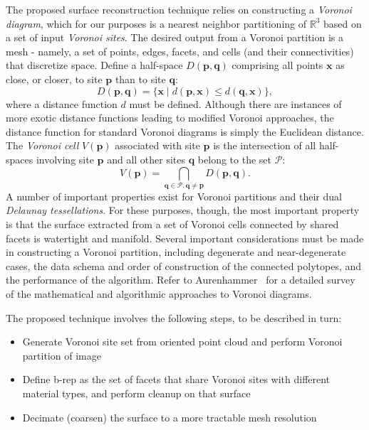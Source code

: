 The proposed surface reconstruction technique relies on constructing a \textit{Voronoi diagram}, which for our purposes is a nearest neighbor partitioning of $\mathbb{R}^3$ based on a set of input \textit{Voronoi sites}. The desired output from a Voronoi partition is a mesh - namely, a set of points, edges, facets, and cells (and their connectivities) that discretize space. Define a half-space $D(\bm{p},\bm{q})$ comprising all points $\bm{x}$ as close, or closer, to site $\bm{p}$ than to site $\bm{q}$:
\begin{equation}
D(\bm{p},\bm{q}) = \{\bm{x} \mid d(\bm{p},\bm{x}) \leq d(\bm{q},\bm{x})\},
\end{equation}
where a distance function $d$ must be defined. Although there are instances of more exotic distance functions leading to modified Voronoi approaches, the distance function for standard Voronoi diagrams is simply the Euclidean distance. The \textit{Voronoi cell} $V(\bm{p})$ associated with site $\bm{p}$ is the intersection of all half-spaces involving site $\bm{p}$ and all other sites $\bm{q}$ belong to the set $\mathcal{P}$:
\begin{equation}
V(\bm{p}) = \bigcap \limits_{\bm{q} \in \mathcal{P}, \bm{q} \neq \bm{p}} D(\bm{p},\bm{q}).
\end{equation}
A number of important properties exist for Voronoi partitions and their dual \textit{Delaunay tessellations}. For these purposes, though, the most important property is that the surface extracted from a set of Voronoi cells connected by shared facets is watertight and manifold. Several important considerations must be made in constructing a Voronoi partition, including degenerate and near-degenerate cases, the data schema and order of construction of the connected polytopes, and the
performance of the algorithm. Refer to Aurenhammer~\cite{aurenhammer_1991} for a detailed survey of the mathematical and algorithmic approaches to Voronoi diagrams.

The proposed technique involves the following steps, to be described in turn:
\begin{itemize}[noitemsep]
\item Generate Voronoi site set from oriented point cloud and perform Voronoi partition of image
\item Define b-rep as the set of facets that share Voronoi sites with different material types, and perform cleanup on that surface
\item Decimate (coarsen) the surface to a more tractable mesh resolution
\end{itemize}


